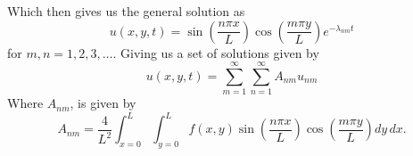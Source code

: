 \documentclass[%
reprint,
nofootinbib,
amsmath,amssymb,
aps,
]{revtex4-1}
\begin{document}
Which then gives us the general solution as 
\begin{equation}
	u(x,y,t) = \sin\left(\frac{n\pi x}{L}\right)\cos\left(\frac{m \pi y}{L}\right)e^{-\lambda_{nm}t}
\end{equation}
for $m,n = 1,2,3,\dots$. Giving us a set of solutions given by 
\begin{equation}
	u(x,y,t) = \sum_{m=1}^\infty\sum_{n = 1}^\infty A_{nm}u_{nm}
\end{equation}
Where $A_{nm}$, is given by 
\begin{equation}
	A_{nm} = \frac{4}{L^2}\int_{x=0}^{L}\int_{y=0}^{L}f(x,y)\sin\left(\frac{n\pi x}{L}\right)\cos\left(\frac{m \pi y}{L}\right)dy\,dx.
\end{equation}
\end{document}
